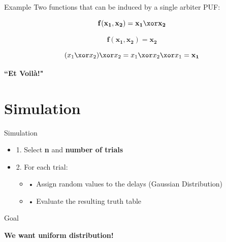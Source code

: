 \documentclass[10pt, compress]{beamer}
\begin{document}
\begin{frame}{Example}
    Two functions that can be induced by a single arbiter PUF:

        \[\mathbf{f(x_1, x_2) = x_1 \xor x_2}\]
    
        \[\mathbf{f(x_1, x_2) = x_2}\]
        
        \vspace{0.5cm}
        
        \[(x_1 \xor x_2) \xor x_2 = x_1 \xor x_2 \xor x_1 = \mathbf{x_1}\]
        
        \vspace{1cm}
        
        \begin{center}
            \large\textbf{``Et Voilà!"}
        \end{center}
\end{frame}




\section{Simulation}

\begin{frame}{Simulation}
    
    \begin{itemize}[itemsep=0.5cm]
        \item 1. Select \textbf{n} and \textbf{number of trials}
        \item 2. For each trial:
        \begin{itemize}[itemsep=0.25cm]
            \item • Assign random values to the delays (Gaussian Distribution)
            \item • Evaluate the resulting truth table
        \end{itemize}
    \end{itemize}
\end{frame}

\begin{frame}{Goal}
    \begin{center}
        \LARGE\textbf{We want uniform distribution!}
    \end{center}
\end{frame}
\end{document}

